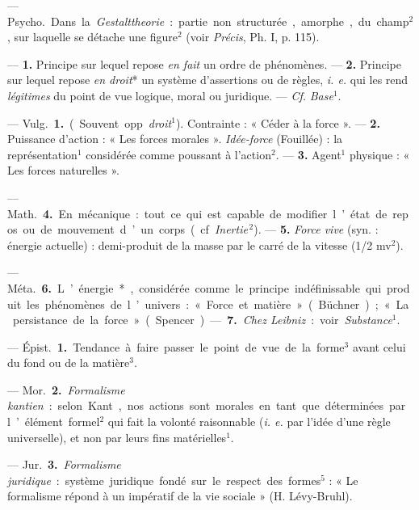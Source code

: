 \begin{itemize}[leftmargin=1cm, label=, itemsep=1pt]
 — \si{Psycho.} Dans la {\it Gestalttheorie} : partie non structurée,
amorphe, du champ$^2$, sur laquelle se détache une figure$^2$
(voir {\it Précis}, Ph. I, p. 115).

 — {\bf 1.} Principe sur lequel repose {\it en fait} un ordre
de phénomènes. — {\bf 2.} Principe sur lequel repose {\it en droit}* un
système d’assertions ou de règles, {\it i. e.} qui les rend {\it légitimes}
du point de vue logique, moral ou juridique. — {\it Cf.} {\it Base}$^1$.

 — \si{Vulg.} {\bf 1.} (Souvent opp. {\it droit}$^1$). Contrainte :
« Céder à la force ». — {\bf 2.} Puissance d'action : « Les forces morales ».
{\it Idée-force} (Fouillée) : la représentation$^1$ considérée comme poussant
à l’action$^2$. — {\bf 3.} Agent$^1$ physique : « Les forces naturelles ».

— \si{Math.} {\bf 4.} En mécanique : tout ce qui est capable de modifier l’état de
repos ou de mouvement d’un corps (cf. {\it Inertie}$^{\,2}$). — {\bf 5.}
{\it Force vive} (syn. : énergie actuelle) : demi-produit de la masse par le
carré de la vitesse (1/2 mv$^2$).

— \si{Méta.} {\bf 6.} L’énergie*, considérée comme le principe indéfinissable
qui produit les phénomènes de l’univers : « Force et matière » (Büchner) ;
« La persistance de la force » (Spencer). — {\bf 7.} {\it Chez Leibniz} :
voir {\it Substance}$^1$.

 — \si{Épist.} {\bf 1.} Tendance à
faire passer le point de vue de la
forme$^3$ avant celui du fond ou de la matière$^3$.

— \si{Mor.} {\bf 2.} {\it Formalisme kantien} : selon Kant, nos actions sont
morales en tant que déterminées par l’élément formel$^2$ qui fait la volonté
raisonnable ({\it i. e.} par l’idée d’une règle universelle), et non par
leurs fins matérielles$^1$.

— \si{Jur.} {\bf 3.} {\it Formalisme juridique} : système juridique fondé sur
le respect des formes$^5$ : « Le formalisme répond à un impératif de la vie
sociale » (H. Lévy-Bruhl).


\end{itemize}
